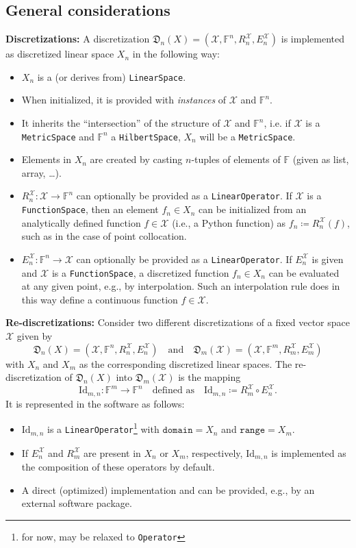 \documentclass[a4paper]{paper}
\newcommand*{\SPC}[1]{{\ensuremath{\mathscr{#1}}}}
\newcommand*{\SPCX}{\SPC{X}}
\newcommand{\FIELD}{{\ensuremath{\mathbb{F}}}}
\newcommand*{\Fn}{{\ensuremath{\FIELD^n}}}
\newcommand*{\Fm}{{\ensuremath{\FIELD^m}}}
\newcommand{\DISCOP}[1]{{\ensuremath{\mathsf{#1}}}}
\newcommand*{\DISCOPID}{\DISCOP{\mathrm{Id}}}
\newcommand*{\EXT}[2]{\ensuremath{E_{#1}^{#2}}}
\newcommand*{\REST}[2]{\ensuremath{R_{#1}^{#2}}}
\newcommand*{\RnX}{{\ensuremath{\REST{n}{\SPC{X}}}}}
\newcommand*{\RmX}{{\ensuremath{\REST{m}{\SPC{X}}}}}
\newcommand*{\EnX}{{\ensuremath{\EXT{n}{\SPC{X}}}}}
\newcommand*{\EmX}{{\ensuremath{\EXT{m}{\SPC{X}}}}}
\newcommand*{\DISCR}[2]{{\ensuremath{\mathfrak{D}_{#2}(#1)}}}
\newcommand*{\DISCRnX}{\DISCR{X}{n}}
\DeclareMathOperator{\DEFEQ}{{\coloneqq}}
\begin{document}
\subsection{General considerations}
\label{subsec:soft:general}
%
\textbf{Discretizations:}
A discretization $\DISCRnX = (\SPCX, \Fn, \RnX, \EnX)$ is implemented as discretized linear 
space $X_n$ in the following way:
%
\begin{itemize}
 \item $X_n$ is a (or derives from) \texttt{LinearSpace}.
 \item When initialized, it is provided with \emph{instances} of $\SPCX$ and $\Fn$.
 \item It inherits the ``intersection'' of the structure of $\SPCX$ and $\Fn$, i.e. if $\SPCX$ is a 
 \texttt{MetricSpace} and $\Fn$ a \texttt{HilbertSpace}, $X_n$ will be a \texttt{MetricSpace}.
 \item Elements in $X_n$ are created by casting $n$-tuples of elements of $\FIELD$ (given as list, array, \dots).
 \item $\RnX \colon \SPCX \to \Fn$ 
   can optionally be provided as a \texttt{LinearOperator}. If $\SPCX$ is a \texttt{FunctionSpace},
   then an element $f_n \in X_n$ can be initialized from an analytically defined function $f \in \SPCX$ 
   (i.e., a Python function) as $f_n \DEFEQ  \RnX(f)$, such as in the case of point collocation.
 \item $\EnX \colon \Fn \to \SPCX$ can optionally be provided as a \texttt{LinearOperator}. 
   If $\EnX$ is given and $\SPCX$ is a \texttt{FunctionSpace}, 
   a discretized function $f_n \in X_n$ can be evaluated at any given point, e.g., by interpolation. 
   Such an interpolation rule does in this way define a continuous function $f \in \SPCX$.
\end{itemize}
%
\textbf{Re-discretizations:}
Consider two different discretizations of a fixed vector space $\SPCX$ given by 
\[ \DISCRnX = (\SPCX, \Fn, \RnX, \EnX)
   \quad\text{and}\quad
  \DISCR{\SPCX}{m} =(\SPCX, \Fm, \RmX, \EmX)
\]  
with $X_n$ and $X_m$ as the corresponding discretized linear spaces.
The re-discreti\-zation of $\DISCRnX$ into $\DISCR{\SPCX}{m}$ is the mapping 
\[  \DISCOPID_{m,n} \colon \Fm \to \Fn
    \quad\text{defined as}\quad
    \DISCOPID_{m,n} \DEFEQ  \RmX \circ \EnX.
\]   
It is represented in the software as follows:
\begin{itemize}
 \item $\DISCOPID_{m,n}$ is a \texttt{LinearOperator}\footnote{for now, may be relaxed to \texttt{Operator}} with 
 $\mathtt{domain} = X_n$ and $\mathtt{range} = X_m$.
 \item If $\EnX$ and $\RmX$ are present in $X_n$ or $X_m$, respectively, $\DISCOPID_{m,n}$ is implemented as the 
 composition of these operators by default.
 \item A direct (optimized) implementation and can be provided, e.g., by an external software package.
\end{itemize}
\end{document}
